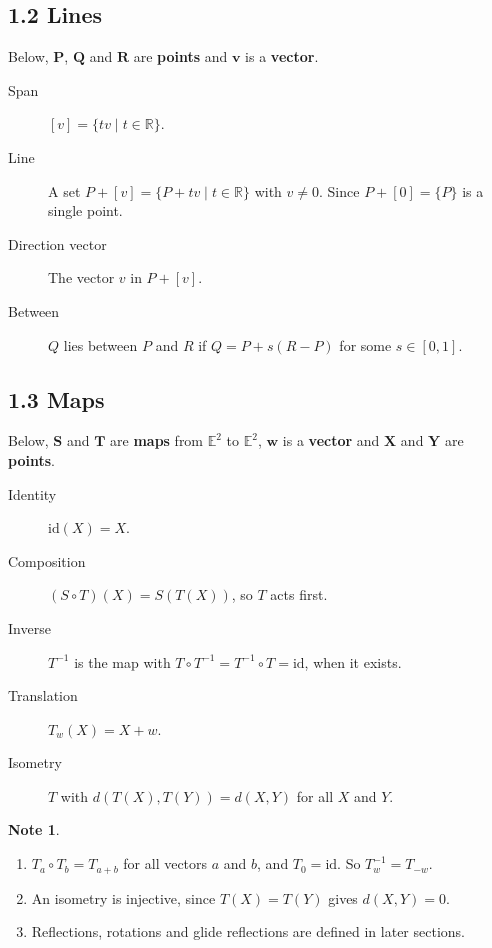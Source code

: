 \documentclass[11pt,a4paper]{article}
\theoremstyle{boxed}
\theoremstyle{definition}
\newtheorem*{note}{Note}
\newcommand{\R}{\mathbb{R}}
\newcommand{\E}{\mathbb{E}^2}
\newcommand{\id}{\mathrm{id}}
\begin{document}
\subsection*{1.2 Lines}
Below, $\boldsymbol{P}$, $\boldsymbol{Q}$ and $\boldsymbol{R}$ are \textbf{points} and $\boldsymbol{v}$ is a \textbf{vector}.
\begin{description}
    \item[Span] $[v]=\{tv \mid t\in\R\}$.
    \item[Line] A set $P+[v]=\{P+tv \mid t\in\R\}$ with $v\neq0$. Since $P+[0]=\{P\}$ is a single point.
    \item[Direction vector] The vector $v$ in $P+[v]$.
    \item[Between] $Q$ lies between $P$ and $R$ if $Q=P+s(R-P)$ for some $s\in[0,1]$.
\end{description}

\subsection*{1.3 Maps}
Below, $\boldsymbol{S}$ and $\boldsymbol{T}$ are \textbf{maps} from $\E$ to $\E$, $\boldsymbol{w}$ is a \textbf{vector} and $\boldsymbol{X}$ and $\boldsymbol{Y}$ are \textbf{points}.
\begin{description}
    \item[Identity] $\id(X)=X$.
    \item[Composition] $(S\circ T)(X)=S(T(X))$, so $T$ acts first.
    \item[Inverse] $T^{-1}$ is the map with $T\circ T^{-1}=T^{-1}\circ T=\id$, when it exists.
    \item[Translation] $T_w(X)=X+w$.
    \item[Isometry] $T$ with $d(T(X),T(Y))=d(X,Y)$ for all $X$ and $Y$.
\end{description}

\begin{note}
\leavevmode
\begin{enumerate}[label=\arabic*.]
    \item $T_a\circ T_b=T_{a+b}$ for all vectors $a$ and $b$, and $T_0=\id$. So $T_w^{-1}=T_{-w}$.
    \item An isometry is injective, since $T(X)=T(Y)$ gives $d(X,Y)=0$.
    \item Reflections, rotations and glide reflections are defined in later sections.
\end{enumerate}
\end{note}
\end{document}

